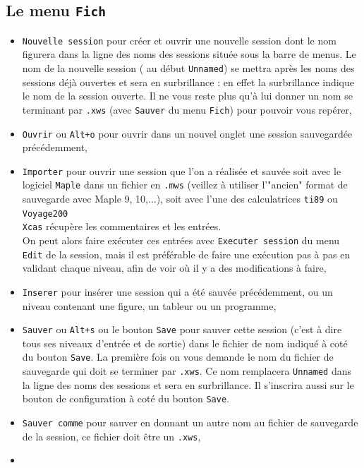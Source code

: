 \documentclass[a4paper,11pt]{article}
\begin{document}
\subsection{Le menu {\tt Fich}}
\begin{itemize}
\item
{\tt Nouvelle session}  pour cr\'eer et ouvrir une nouvelle session dont le nom
figurera dans la ligne des noms des sessions situ\'ee sous la barre de menus. 
Le nom de la nouvelle session ( au d\'ebut {\tt Unnamed}) se mettra apr\`es les
noms des sessions d\'ej\`a ouvertes et sera en surbrillance : en effet la 
surbrillance indique le nom de la session ouverte. Il ne vous reste plus qu'\`a
lui donner un nom se terminant par {\tt .xws} (avec {\tt Sauver} du menu 
{\tt Fich}) pour pouvoir vous rep\'erer,
\item
{\tt Ouvrir} ou {\tt Alt+o} pour ouvrir dans un nouvel onglet
une session sauvegard\'ee pr\'ec\'edemment, 
\item
{\tt Importer} pour ouvrir une session que l'on a r\'ealis\'ee et sauv\'ee soit avec le logiciel 
{\tt Maple} dans un fichier en {\tt .mws} (veillez \`a utiliser l'"ancien" format de sauvegarde avec 
Maple 9, 10,...), soit avec l'une des  calculatrices {\tt ti89} ou {\tt Voyage200} \\
{\tt Xcas} r\'ecup\`ere les commentaires et les entr\'ees.\\
On peut alors faire ex\'ecuter ces entr\'ees avec {\tt Executer session} du menu {\tt Edit} de la session, 
mais il est pr\'ef\'erable de faire une ex\'ecution pas \`a pas en validant chaque niveau, afin de voir 
o\`u il y a des modifications \`a faire, 
\item
{\tt Inserer} pour ins\'erer une session qui a \'et\'e sauv\'ee
 pr\'ec\'edemment, ou un niveau contenant une figure, un tableur
ou un programme,
\item 
{\tt Sauver}  ou {\tt Alt+s}  ou le bouton {\tt Save}
pour sauver cette session (c'est \`a dire tous ses niveaux 
d'entr\'ee et de sortie) dans le fichier de nom indiqu\'e 
\`a cot\'e du bouton {\tt Save}. La premi\`ere fois on vous demande le nom du 
fichier de sauvegarde qui doit se terminer par {\tt .xws}. Ce nom remplacera
{\tt Unnamed} dans la ligne des noms des sessions et sera en surbrillance. Il 
s'inscrira aussi sur le bouton de configuration \`a cot\'e du bouton 
{\tt Save}.
\item
{\tt Sauver comme} pour sauver en donnant un autre nom au fichier de 
sauvegarde de la session, ce fichier doit \^etre un {\tt .xws},
\item

\end{itemize}
\end{document}
